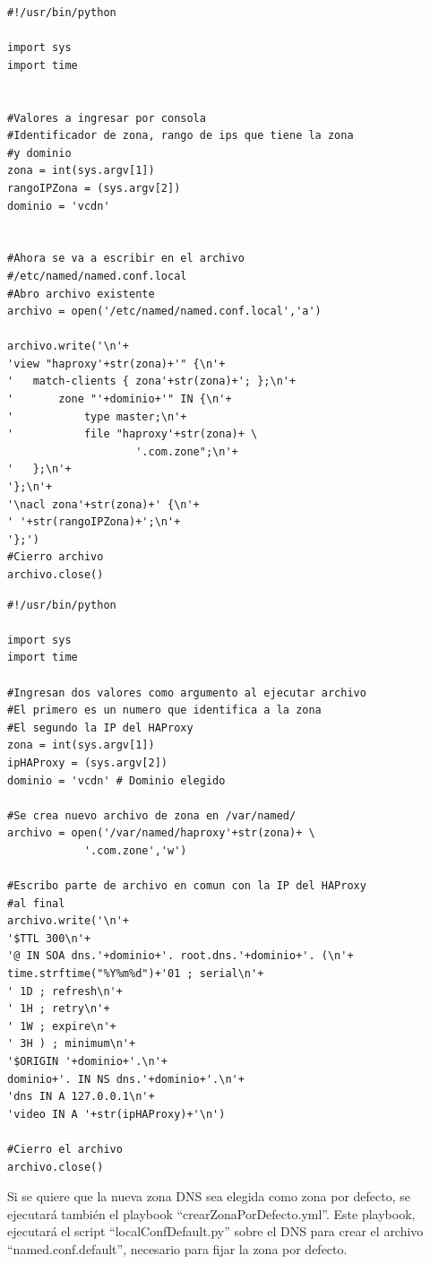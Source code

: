 \documentclass[12pt,a4paper,oneside]{book}
\begin{document}
\begin{lstlisting}[style=codigobase,  caption= localConfNuevaZona.py, label=cod_localConf]
#!/usr/bin/python

import sys
import time


#Valores a ingresar por consola
#Identificador de zona, rango de ips que tiene la zona
#y dominio
zona = int(sys.argv[1])
rangoIPZona = (sys.argv[2])
dominio = 'vcdn'


#Ahora se va a escribir en el archivo
#/etc/named/named.conf.local
#Abro archivo existente
archivo = open('/etc/named/named.conf.local','a')

archivo.write('\n'+
'view "haproxy'+str(zona)+'" {\n'+
'	match-clients { zona'+str(zona)+'; };\n'+
'		zone "'+dominio+'" IN {\n'+
'			type master;\n'+
'			file "haproxy'+str(zona)+ \
                    '.com.zone";\n'+
'	};\n'+
'};\n'+
'\nacl zona'+str(zona)+' {\n'+
' '+str(rangoIPZona)+';\n'+
'};')
#Cierro archivo
archivo.close()

\end{lstlisting}

\vspace{0,5cm}

\begin{lstlisting}[style=codigobase,  caption= dbNuevaZona.py, label=cod_dbNuevo]
#!/usr/bin/python

import sys
import time

#Ingresan dos valores como argumento al ejecutar archivo
#El primero es un numero que identifica a la zona
#El segundo la IP del HAProxy
zona = int(sys.argv[1])
ipHAProxy = (sys.argv[2])
dominio = 'vcdn' # Dominio elegido

#Se crea nuevo archivo de zona en /var/named/
archivo = open('/var/named/haproxy'+str(zona)+ \
            '.com.zone','w')

#Escribo parte de archivo en comun con la IP del HAProxy
#al final
archivo.write('\n'+
'$TTL 300\n'+ 
'@ IN SOA dns.'+dominio+'. root.dns.'+dominio+'. (\n'+
time.strftime("%Y%m%d")+'01 ; serial\n'+
' 1D ; refresh\n'+
' 1H ; retry\n'+
' 1W ; expire\n'+
' 3H ) ; minimum\n'+
'$ORIGIN '+dominio+'.\n'+
dominio+'. IN NS dns.'+dominio+'.\n'+
'dns IN A 127.0.0.1\n'+
'video IN A '+str(ipHAProxy)+'\n')

#Cierro el archivo
archivo.close()

\end{lstlisting}

\vspace{0,5cm}

Si se quiere que la nueva zona DNS sea elegida como zona por defecto, se ejecutará también el playbook ``crearZonaPorDefecto.yml''.
Este playbook, ejecutará el script ``localConfDefault.py'' sobre el DNS para crear el archivo ``named.conf.default'', necesario para fijar la zona por defecto.
\end{document}
